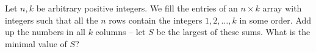 Let $n,k$ be arbitrary positive integers. We fill the entries of an $n\times k$ array with integers such that all the $n$ rows contain the integers $1,2,\dots,k$ in some order. Add up the numbers in all $k$ columns – let $S$ be the largest of these sums. What is the minimal value of $S$?